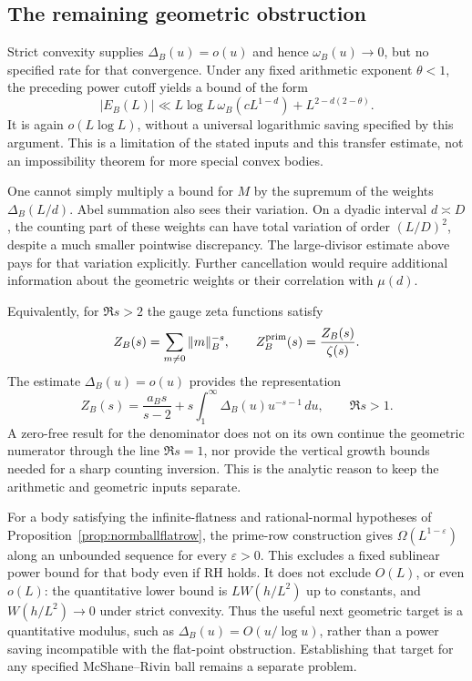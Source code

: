 \documentclass[11pt,a4paper]{article}
\numberwithin{equation}{section}
\theoremstyle{definition}
\theoremstyle{remark}
\begin{document}
\subsection{The remaining geometric obstruction}
Strict convexity supplies $\Delta_B(u)=o(u)$ and hence
$\omega_B(u)\to0$, but no specified rate for that convergence.
Under any fixed arithmetic exponent $\theta<1$, the preceding
power cutoff yields a bound of the form
\[
 |E_B(L)|\ll L\log L\,\omega_B(cL^{1-d})
                      +L^{2-d(2-\theta)}.
\]
It is again $o(L\log L)$, without a universal logarithmic saving
specified by this argument.  This is a limitation of the stated inputs
and this transfer estimate, not an impossibility theorem for more
special convex bodies.

One cannot simply multiply a bound for $M$ by the supremum of the
weights $\Delta_B(L/d)$.  Abel summation also sees their variation.
On a dyadic interval $d\asymp D$, the counting part of these weights
can have total variation of order $(L/D)^2$, despite a much smaller
pointwise discrepancy.  The large-divisor estimate above pays for
that variation explicitly.  Further cancellation would require
additional information about the geometric weights or their correlation
with $\mu(d)$.

Equivalently, for $\Re s>2$ the gauge zeta functions satisfy
\[
 Z_B(s)=\sum_{m\ne0}\|m\|_B^{-s},\qquad
 Z_B^{\rm prim}(s)=\frac{Z_B(s)}{\zeta(s)}.
\]
The estimate $\Delta_B(u)=o(u)$ provides the representation
\[
 Z_B(s)=\frac{a_Bs}{s-2}
          +s\int_1^\infty\Delta_B(u)u^{-s-1}\,du,
 \qquad \Re s>1.
\]
A zero-free result for the denominator does not on its own continue
the geometric numerator through the line $\Re s=1$, nor provide the
vertical growth bounds needed for a sharp counting inversion.  This is
the analytic reason to keep the arithmetic and geometric inputs separate.


For a body satisfying the infinite-flatness and rational-normal hypotheses
of Proposition~\ref{prop:normballflatrow}, the prime-row construction gives
$\Omega(L^{1-\varepsilon})$ along an unbounded sequence for every
$\varepsilon>0$. This excludes a fixed sublinear power bound for that
body even if RH holds. It does not exclude $O(L)$, or even $o(L)$:
the quantitative lower bound is $L W(h/L^2)$ up to constants, and
$W(h/L^2)\to0$ under strict convexity. Thus the useful next geometric
target is a quantitative modulus, such as
$\Delta_B(u)=O(u/\log u)$, rather than a power saving incompatible
with the flat-point obstruction. Establishing that target for any
specified McShane--Rivin ball remains a separate problem.
\end{document}
